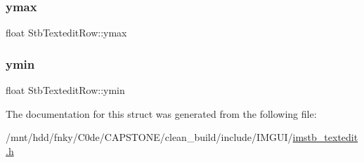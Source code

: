 \mbox{\label{structStbTexteditRow_aab290e15f6a3b4a96ab2c2472cc8a7a5}} 
\subsubsection{\texorpdfstring{ymax}{ymax}}
{\footnotesize\ttfamily float Stb\+Textedit\+Row\+::ymax}

\mbox{\label{structStbTexteditRow_a707d331bd9dc99d64c81f71106b75eed}} 
\subsubsection{\texorpdfstring{ymin}{ymin}}
{\footnotesize\ttfamily float Stb\+Textedit\+Row\+::ymin}



The documentation for this struct was generated from the following file\+:\begin{DoxyCompactItemize}
\item 
/mnt/hdd/fnky/\+C0de/\+C\+A\+P\+S\+T\+O\+N\+E/clean\+\_\+build/include/\+I\+M\+G\+U\+I/\hyperlink{imstb__textedit_8h}{imstb\+\_\+textedit.\+h}\end{DoxyCompactItemize}
